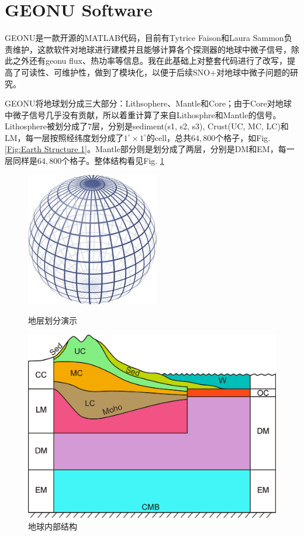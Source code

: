 		\section{GEONU Software}
			GEONU是一款开源的MATLAB代码，目前有Tytrice Faison和Laura Sammon负责维护\cite{Original_GEONU}，这款软件对地球进行建模并且能够计算各个探测器的地球中微子信号，除此之外还有geonu flux、热功率等信息。我在此基础上对整套代码进行了改写，提高了可读性、可维护性，做到了模块化，以便于后续SNO+对地球中微子问题的研究。\par
			GEONU将地球划分成三大部分：Lithsophere、Mantle和Core；由于Core对地球中微子信号几乎没有贡献，所以着重计算了来自Lithosphre和Mantle的信号。Lithosphere被划分成了7层，分别是sediment(s1, s2, s3), Crust(UC, MC, LC)和LM，每一层按照经纬度划分成了$1^\circ \times 1^\circ$的cell，总共$64,800$个格子，如Fig. \ref{Fig:Earth Structure 1}。Mantle部分则是划分成了两层，分别是DM和EM，每一层同样是$64,800$个格子。整体结构看见Fig. \ref{Fig:Earth Structure 2}
				\begin{figure}[H]
					\centering
					\includegraphics[scale = 1]{./Pics/Earth_Structure_1.jpg}
					\caption{地层划分演示}
					\label{Fig:Earth Structure 1}
					\includegraphics[scale = 0.15]{./Pics/Earth_Structure_2.jpg}
					\caption{地球内部结构\cite{huang2013reference}}
					\label{Fig:Earth Structure 2}
				\end{figure}
